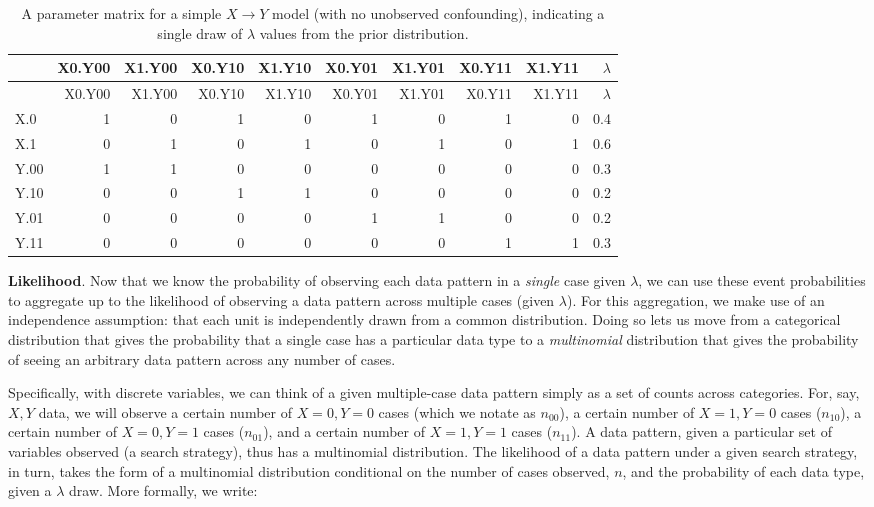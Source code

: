 \documentclass[
  12pt,
]{book}
\begin{document}
\begin{longtable}[]{@{}lrrrrrrrrr@{}}
\caption{\label{tab:parammmatrixmix}A parameter matrix for a simple \(X \rightarrow Y\) model (with no unobserved confounding), indicating a single draw of \(\lambda\) values from the prior distribution.}\tabularnewline
\toprule
& X0.Y00 & X1.Y00 & X0.Y10 & X1.Y10 & X0.Y01 & X1.Y01 & X0.Y11 & X1.Y11 & \(\lambda\) \\
\midrule
\endfirsthead
\toprule
& X0.Y00 & X1.Y00 & X0.Y10 & X1.Y10 & X0.Y01 & X1.Y01 & X0.Y11 & X1.Y11 & \(\lambda\) \\
\midrule
\endhead
X.0 & 1 & 0 & 1 & 0 & 1 & 0 & 1 & 0 & 0.4 \\
X.1 & 0 & 1 & 0 & 1 & 0 & 1 & 0 & 1 & 0.6 \\
Y.00 & 1 & 1 & 0 & 0 & 0 & 0 & 0 & 0 & 0.3 \\
Y.10 & 0 & 0 & 1 & 1 & 0 & 0 & 0 & 0 & 0.2 \\
Y.01 & 0 & 0 & 0 & 0 & 1 & 1 & 0 & 0 & 0.2 \\
Y.11 & 0 & 0 & 0 & 0 & 0 & 0 & 1 & 1 & 0.3 \\
\bottomrule
\end{longtable}

\textbf{Likelihood}. Now that we know the probability of observing each data pattern in a \emph{single} case given \(\lambda\), we can use these event probabilities to aggregate up to the likelihood of observing a data pattern across multiple cases (given \(\lambda\)). For this aggregation, we make use of an independence assumption: that each unit is independently drawn from a common distribution. Doing so lets us move from a categorical distribution that gives the probability that a single case has a particular data type to a \emph{multinomial} distribution that gives the probability of seeing an arbitrary data pattern across any number of cases.

Specifically, with discrete variables, we can think of a given multiple-case data pattern simply as a set of counts across categories. For, say, \(X, Y\) data, we will observe a certain number of \(X=0, Y=0\) cases (which we notate as \(n_{00}\)), a certain number of \(X=1, Y=0\) cases (\(n_{10}\)), a certain number of \(X=0, Y=1\) cases (\(n_{01}\)), and a certain number of \(X=1, Y=1\) cases (\(n_{11}\)). A data pattern, given a particular set of variables observed (a search strategy), thus has a multinomial distribution. The likelihood of a data pattern under a given search strategy, in turn, takes the form of a multinomial distribution conditional on the number of cases observed, \(n\), and the probability of each data type, given a \(\lambda\) draw. More formally, we write:
\end{document}
